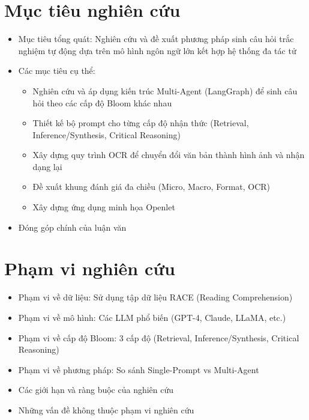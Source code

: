 \section{Mục tiêu nghiên cứu}
\begin{itemize}
    \item Mục tiêu tổng quát: Nghiên cứu và đề xuất phương pháp sinh câu hỏi trắc nghiệm tự động dựa trên mô hình ngôn ngữ lớn kết hợp hệ thống đa tác tử
    \item Các mục tiêu cụ thể:
    \begin{itemize}
        \item Nghiên cứu và áp dụng kiến trúc Multi-Agent (LangGraph) để sinh câu hỏi theo các cấp độ Bloom khác nhau
        \item Thiết kế bộ prompt cho từng cấp độ nhận thức (Retrieval, Inference/Synthesis, Critical Reasoning)
        \item Xây dựng quy trình OCR để chuyển đổi văn bản thành hình ảnh và nhận dạng lại
        \item Đề xuất khung đánh giá đa chiều (Micro, Macro, Format, OCR)
        \item Xây dựng ứng dụng minh họa Openlet
    \end{itemize}
    \item Đóng góp chính của luận văn
\end{itemize}

\section{Phạm vi nghiên cứu}
\begin{itemize}
    \item Phạm vi về dữ liệu: Sử dụng tập dữ liệu RACE (Reading Comprehension)
    \item Phạm vi về mô hình: Các LLM phổ biến (GPT-4, Claude, LLaMA, etc.)
    \item Phạm vi về cấp độ Bloom: 3 cấp độ (Retrieval, Inference/Synthesis, Critical Reasoning)
    \item Phạm vi về phương pháp: So sánh Single-Prompt vs Multi-Agent
    \item Các giới hạn và ràng buộc của nghiên cứu
    \item Những vấn đề không thuộc phạm vi nghiên cứu
\end{itemize}

